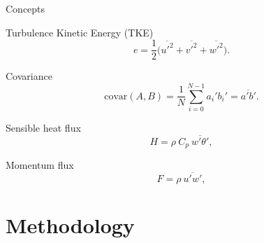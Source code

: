 \documentclass{beamer}
\begin{document}
\begin{frame}{Concepts}

\begin{block}{Turbulence Kinetic Energy (TKE)}
\begin{equation}
    e = \frac{1}{2} \big(\overline{u'^2} + \overline{v'^2} + \overline{w'^2}\big).
    \label{eq:tke}
\end{equation}
\end{block}

\begin{block}{Covariance}
\begin{equation}
    \text{covar}(A,B) = \frac{1}{N}\sum_{i=0}^{N-1} a_i' b_i'= \overline{a'b'}.
\end{equation}
\end{block}

\begin{block}{Sensible heat flux}
\begin{equation}
    H = \rho \ C_p \ \overline{w'\theta'},
\end{equation}
\end{block}

\begin{block}{Momentum flux}
\begin{equation}
    F = \rho \ \overline{u'w'},
\end{equation}
\end{block}

\end{frame}


\section{Methodology}
\end{document}
